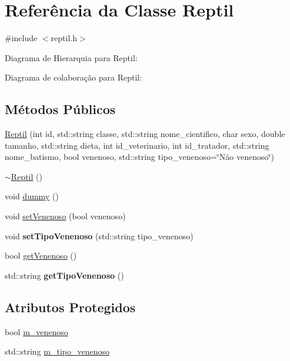 \hypertarget{classReptil}{}\section{Referência da Classe Reptil}
\label{classReptil}


{\ttfamily \#include $<$reptil.\+h$>$}



Diagrama de Hierarquia para Reptil\+:


Diagrama de colaboração para Reptil\+:
\subsection*{Métodos Públicos}
\begin{DoxyCompactItemize}
\item 
\hyperlink{classReptil_a7fcd4e6da06fcb4087101d0dc2d151d9}{Reptil} (int id, std\+::string classe, std\+::string nome\+\_\+cientifico, char sexo, double tamanho, std\+::string dieta, int id\+\_\+veterinario, int id\+\_\+tratador, std\+::string nome\+\_\+batismo, bool venenoso, std\+::string tipo\+\_\+venenoso=\char`\"{}Não venenoso\char`\"{})
\item 
\hyperlink{classReptil_a826ed679cc45f74fefecef7d4d40b409}{$\sim$\+Reptil} ()
\item 
void \hyperlink{classReptil_acfbb0461fc05ec7b08332dd4cee122c6}{dummy} ()
\item 
void \hyperlink{classReptil_a9f7ab2a0e2b30040c7c9df48039a266a}{set\+Venenoso} (bool venenoso)
\item 
\mbox{\label{classReptil_a9324c68abc26ab008f00fd173605fd76}} 
void {\bfseries set\+Tipo\+Venenoso} (std\+::string tipo\+\_\+venenoso)
\item 
bool \hyperlink{classReptil_a75138aaa91420a9f82ddd39c19ea8b78}{get\+Venenoso} ()
\item 
\mbox{\label{classReptil_a2d1ee6cdb451af697e0dc795c24d9ce7}} 
std\+::string {\bfseries get\+Tipo\+Venenoso} ()
\end{DoxyCompactItemize}
\subsection*{Atributos Protegidos}
\begin{DoxyCompactItemize}
\item 
bool \hyperlink{classReptil_ac195c1dc9a0fa38bc0551034c609c434}{m\+\_\+venenoso}
\item 
std\+::string \hyperlink{classReptil_a0c68bf074b4645f98436016d9ceb358a}{m\+\_\+tipo\+\_\+venenoso}
\end{DoxyCompactItemize}
